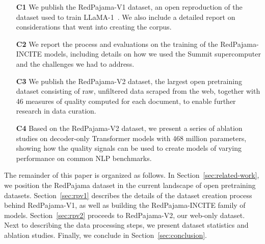 \documentclass{article}
\begin{document}
\begin{itemize}[leftmargin=1.75em]
    \item [\bf C1] We publish the RedPajama-V1 dataset, an open reproduction of the dataset used to train LLaMA-1~\cite{touvron2023allama}. We also include a detailed report on considerations that went into creating the corpus. 
    \item [\bf C2] We report the process and evaluations on the training of the RedPajama-INCITE models, including details on how we used the Summit supercomputer and the challenges we had to address.
    \item [\bf C3] We publish the RedPajama-V2 dataset, the largest open pretraining dataset consisting of raw, unfiltered data scraped from the web, together with 46 measures of quality computed for each document, to enable further research in data curation.
    \item [\bf C4] Based on the RedPajama-V2 dataset, we present a series of ablation studies on decoder-only Transformer models with 468 million parameters, showing how the quality signals can be used to create models of varying performance on common NLP benchmarks.
\end{itemize}

The remainder of this paper is organized as follows. In Section~\ref{sec:related-work}, we position the RedPajama dataset in the current landscape of open pretraining datasets. Section~\ref{sec:rpv1} describes the details of the dataset creation process behind RedPajama-V1, as well as building the RedPajama-INCITE family of models. Section~\ref{sec:rpv2} proceeds to RedPajama-V2, our web-only dataset. Next to describing the data processing steps, we present dataset statistics and ablation studies. Finally, we conclude in Section~\ref{sec:conclusion}.
\end{document}
